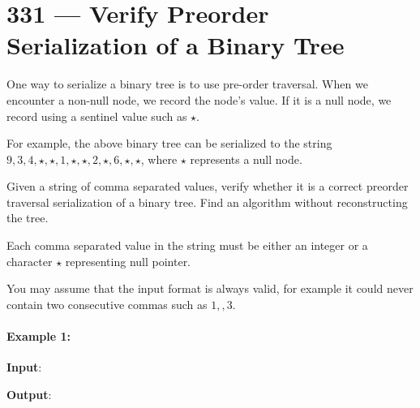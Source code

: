 \section{331 --- Verify Preorder Serialization of a Binary Tree}
One way to serialize a binary tree is to use pre-order traversal. When we encounter a non-null node, we record the node's value. If it is a null node, we record using a sentinel value such as $\star$.
\begin{figure}[H]
\end{figure}
For example, the above binary tree can be serialized to the string $9,3,4,\star,\star,1,\star,\star,2,\star,6,\star,\star$, where $\star$ represents a null node.
\par
Given a string of comma separated values, verify whether it is a correct preorder traversal serialization of a binary tree. Find an algorithm without reconstructing the tree.
\par
Each comma separated value in the string must be either an integer or a character $\star$ representing null pointer.
\par
You may assume that the input format is always valid, for example it could never contain two consecutive commas such as $1,,3$.

\paragraph{Example 1:}
\begin{flushleft}
\textbf{Input}: 

\textbf{Output}: 
\end{flushleft}

